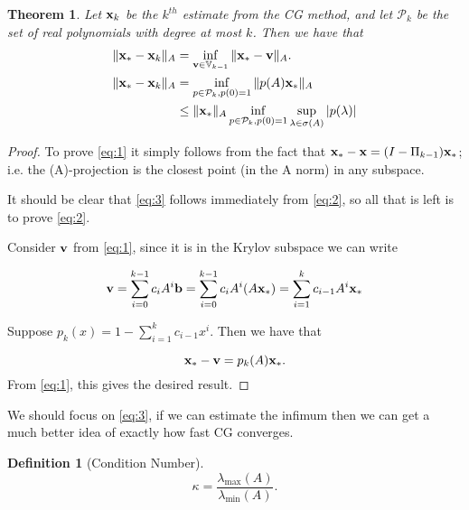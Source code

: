 \documentclass{article}
\newcommand{\bx}{{\bf x}}
\newcommand{\bb}{{\bf b}}
\newcommand{\bv}{{\bf v}}
\newcommand{\V}{\mathbb{V}}
\newcommand{\beq}{\begin{equation}}
\newcommand{\eeq}{\end{equation}}
\newtheorem{thm}{Theorem}[section]
\newtheorem{defn}{Definition}[section]
\theoremstyle{remark}
\begin{document}
\begin{thm} Let $\bx_k$ be the $k^{th}$ estimate from the CG method, and let $\mathcal{P}_k$ be the set of real polynomials with degree at most $k$. Then we have that
\begin{align}
\label{eq:1}\|\bx_* - \bx_{k} \|_A &= \inf_{\bv \in \V_{k-1}}\|\bx_* - \bv \|_A.\\
\label{eq:2}\|\bx_* - \bx_k \|_A &= \inf_{p \in \mathcal{P}_k, p(0) = 1} \|p(A)\bx_* \|_A \\
\label{eq:3} &\leq  \|\bx_* \|_A \inf_{p \in \mathcal{P}_k, p(0) = 1} \sup_{\lambda \in \sigma(A)}|p(\lambda)| 
\end{align}
\end{thm}

\begin{proof}
To prove \eqref{eq:1} it simply follows from the fact that $\bx_* - \bx = (I-\Pi_{k-1})\bx_*$; i.e. the (A)-projection is the closest point (in the A norm) in any subspace.

It should be clear that  \eqref{eq:3} follows immediately from \eqref{eq:2}, so all that is left is to prove \eqref{eq:2}.

Consider $\bv$ from \eqref{eq:1}, since it is in the Krylov subspace we can write 

\beq
\bv = \sum_{i=0}^{k-1}c_i A^i \bb = \sum_{i=0}^{k-1} c_i A^i(A\bx_*) = \sum_{i=1}^{k} c_{i-1} A^i\bx_*
\eeq

Suppose $p_k(x) = 1 - \sum_{i=1}^k c_{i-1}x^i$. Then we have that 

\beq
\bx_* - \bv = p_k(A)\bx_*.
\eeq
From \eqref{eq:1}, this gives the desired result. 
\end{proof}

We should focus on \eqref{eq:3}, if we can estimate the infimum then we can get a much better idea of exactly how fast CG converges. 
\begin{defn}[Condition Number]
\beq
\kappa= \frac{\lambda_{\text{max}}(A)}{\lambda_{\text{min}}(A)}.
\eeq
\end{defn}
\end{document}

